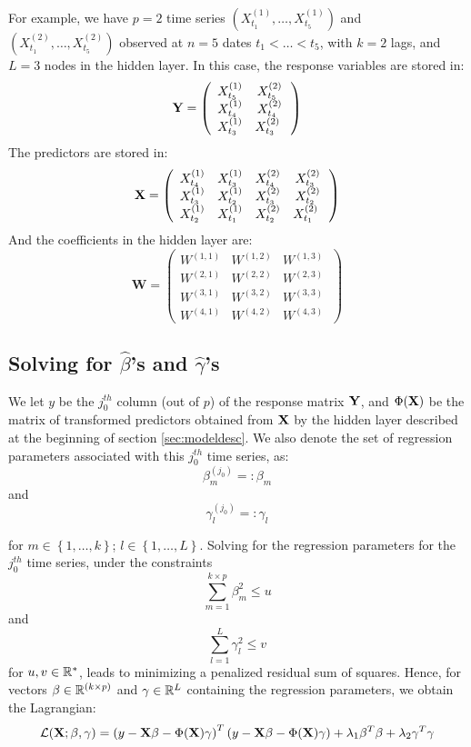 For example, we have $p = 2$ time series $(X^{(1)}_{t_1}, \ldots,  X^{(1)}_{t_5})$ and $(X^{(2)}_{t_1}, \ldots,  X^{(2)}_{t_5})$ observed at $n = 5$ dates $t_1 < \ldots < t_5$, with $k = 2$ lags, and $L = 3$ nodes in the hidden layer. In this case, the response variables are stored in:
$$
{\bf Y} = \left( {\begin{array}{cc} X^{(1)}_{t_5} &  X^{(2)}_{t_5}\\ X^{(1)}_{t_4} & X^{(2)}_{t_4} \\ X^{(1)}_{t_3} & X^{(2)}_{t_3}\      \end{array} } \right)
$$
The predictors are stored in:
$$
{\bf X} = \left( {\begin{array}{cccc} X^{(1)}_{t_4} & X^{(1)}_{t_3} & X^{(2)}_{t_4} & X^{(2)}_{t_3} \\ X^{(1)}_{t_3} & X^{(1)}_{t_2} & X^{(2)}_{t_3} & X^{(2)}_{t_2} \\ X^{(1)}_{t_2} & X^{(1)}_{t_1} & X^{(2)}_{t_2} & X^{(2)}_{t_1} \      \end{array} }\right)
$$
And the coefficients in the hidden layer are:
$$
\textbf{W} = \left( {\begin{array}{ccc} W^{(1, 1)} & W^{(1, 2)} & W^{(1, 3)}  \\ W^{(2, 1)} & W^{(2, 2)} & W^{(2, 3)}  \\ W^{(3, 1)} & W^{(3, 2)} & W^{(3, 3)} \\ W^{(4, 1)} & W^{(4, 2)} & W^{(4, 3)}  \      \end{array} }\right)
$$

\subsection{Solving for $\hat{\beta}$'s and $\hat{\gamma}$'s}
\label{solve_rvfl}

We let $y$ be the $j_0^{th}$ column (out of $p$) of the response matrix ${\bf Y}$, and $\Phi({\bf X})$ be the matrix of transformed predictors obtained from ${\bf X}$ by the hidden layer described at the beginning of section \ref{sec:modeldesc}. We also denote the set of regression parameters associated with this $j_0^{th}$ time series, as:
$$
\beta_m^{(j_0)} =: \beta_m
$$
and
$$
\gamma_l^{(j_0)} =: \gamma_l
$$

for $m \in \left\lbrace 1, \ldots, k \right\rbrace$; $l \in \left\lbrace 1, \ldots,  L\right\rbrace$. Solving for the regression parameters for the $j_0^{th}$ time series, under the constraints
$$
\sum_{m=1}^{k\times p} \beta_m^2 \leq u
$$
and
$$
\sum_{l=1}^L \gamma_l^2 \leq v
$$
for $u, v \in \mathbb{R}^*$, leads to minimizing a penalized residual sum of squares. Hence, for vectors $\beta \in  \mathbb{R}^{(k \times p)}$ and $\gamma \in  \mathbb{R}^L$ containing the regression parameters, we obtain the Lagrangian:
$$
\mathcal{L}({\bf X}; \beta, \gamma) = \left(y - {\bf X}\beta -
\Phi({\bf X})\gamma\right)^T\left(y - {\bf X}\beta - \Phi({\bf X})\gamma\right) + \lambda_1
\beta^T \beta + \lambda_2 \gamma^T\gamma
$$

